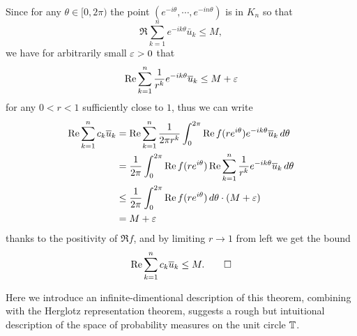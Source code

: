 \documentclass[12pt]{article}
\begin{document}
\begin{pf}
Since for any $\theta\in[0,2\pi)$ the point $(e^{-i\theta},\cdots,e^{-in\theta})$ is in $K_n$ so that
\[\Re\sum_{k=1}^ne^{-ik\theta}\bar u_k\le M,\]
we have for arbitrarily small $\e>0$ that
\[\Re\sum_{k=1}^n\frac1{r^k}e^{-ik\theta}\bar u_k\le M+\e\]
for any $0<r<1$ sufficiently close to $1$, thus we can write
\begin{align*}
\Re\sum_{k=1}^nc_k\bar u_k
&=\Re\sum_{k=1}^n\frac1{2\pi r^k}\int_0^{2\pi}\Re f(re^{i\theta})e^{-ik\theta}\bar u_k\,d\theta\\
&=\frac1{2\pi}\int_0^{2\pi}\Re f(re^{i\theta})\Re\sum_{k=1}^n\frac1{r^k}e^{-ik\theta}\bar u_k\,d\theta\\
&\le\frac1{2\pi}\int_0^{2\pi}\Re f(re^{i\theta})\,d\theta\cdot(M+\e)\\
&=M+\e
\end{align*}
thanks to the positivity of $\Re f$, and by limiting $r\to1$ from left we get the bound
\[\Re\sum_{k=1}^nc_k\bar u_k\le M.\qedhere\]
\end{pf}


Here we introduce an infinite-dimentional description of this theorem, combining with the Herglotz representation theorem, suggests a rough but intuitional description of the space of probability measures on the unit circle $\T$.
\end{document}
